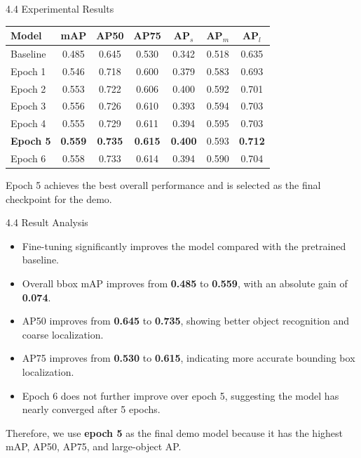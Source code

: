 \documentclass[aspectratio=169,10pt]{beamer}
\begin{document}
\begin{frame}{4.4 Experimental Results}
\scriptsize
\begin{table}
\centering
\begin{tabular}{lcccccc}
\hline
\textbf{Model} & \textbf{mAP} & \textbf{AP50} & \textbf{AP75} & \textbf{AP$_s$} & \textbf{AP$_m$} & \textbf{AP$_l$} \\
\hline
Baseline & 0.485 & 0.645 & 0.530 & 0.342 & 0.518 & 0.635 \\
Epoch 1 & 0.546 & 0.718 & 0.600 & 0.379 & 0.583 & 0.693 \\
Epoch 2 & 0.553 & 0.722 & 0.606 & 0.400 & 0.592 & 0.701 \\
Epoch 3 & 0.556 & 0.726 & 0.610 & 0.393 & 0.594 & 0.703 \\
Epoch 4 & 0.555 & 0.729 & 0.611 & 0.394 & 0.595 & 0.703 \\
\textbf{Epoch 5} & \textbf{0.559} & \textbf{0.735} & \textbf{0.615} & \textbf{0.400} & 0.593 & \textbf{0.712} \\
Epoch 6 & 0.558 & 0.733 & 0.614 & 0.394 & 0.590 & 0.704 \\
\hline
\end{tabular}
\end{table}

\vspace{0.5em}

\small
Epoch 5 achieves the best overall performance and is selected as the final checkpoint for the demo.
\end{frame}

\begin{frame}{4.4 Result Analysis}
\small
\begin{itemize}
    \item Fine-tuning significantly improves the model compared with the pretrained baseline.
    \item Overall bbox mAP improves from \textbf{0.485} to \textbf{0.559}, with an absolute gain of \textbf{0.074}.
    \item AP50 improves from \textbf{0.645} to \textbf{0.735}, showing better object recognition and coarse localization.
    \item AP75 improves from \textbf{0.530} to \textbf{0.615}, indicating more accurate bounding box localization.
    \item Epoch 6 does not further improve over epoch 5, suggesting the model has nearly converged after 5 epochs.
\end{itemize}

\vspace{0.8em}

\small
Therefore, we use \textbf{epoch 5} as the final demo model because it has the highest mAP, AP50, AP75, and large-object AP.
\end{frame}
\end{document}
